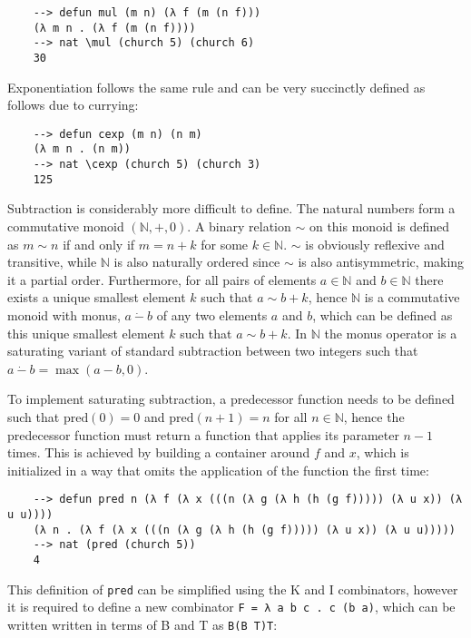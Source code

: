\begin{Verbatim}
    --> defun mul (m n) (λ f (m (n f)))
    (λ m n . (λ f (m (n f))))
    --> nat \mul (church 5) (church 6)
    30
\end{Verbatim}

Exponentiation follows the same rule and can be very succinctly defined as follows due to currying:

\begin{Verbatim}
    --> defun cexp (m n) (n m)
    (λ m n . (n m))
    --> nat \cexp (church 5) (church 3)
    125
\end{Verbatim}

Subtraction is considerably more difficult to define. The natural numbers form a commutative monoid $(\mathbb{N}, +, 0)$. A binary relation $\sim$ on this monoid is defined as $m\sim n$ if and only if $m = n + k$ for some $k \in \mathbb{N}$. $\sim$ is obviously reflexive and transitive, while $\mathbb{N}$ is also naturally ordered since $\sim$ is also antisymmetric, making it a partial order. Furthermore, for all pairs of elements $a \in \mathbb{N}$ and $b \in \mathbb{N}$ there exists a unique smallest element $k$ such that $a \sim b + k$, hence $\mathbb{N}$ is a commutative monoid with monus, $a\ \dot -\ b$ of any two elements $a$ and $b$, which can be defined as this unique smallest element $k$ such that $a \sim b + k$. In $\mathbb{N}$ the monus operator is a saturating variant of standard subtraction between two integers such that $a\ \dot -\ b = \max(a - b, 0)$. 

To implement saturating subtraction, a predecessor function needs to be defined such that $\text{pred}(0) = 0$ and $\text{pred}(n + 1) = n$ for all $n \in \mathbb{N}$, hence the predecessor function must return a function that applies its parameter $n - 1$ times. This is achieved by building a container around $f$ and $x$, which is initialized in a way that omits the application of the function the first time:

\begin{Verbatim}
    --> defun pred n (λ f (λ x (((n (λ g (λ h (h (g f))))) (λ u x)) (λ u u))))
    (λ n . (λ f (λ x (((n (λ g (λ h (h (g f))))) (λ u x)) (λ u u)))))
    --> nat (pred (church 5))
    4
\end{Verbatim}

This definition of \verb|pred| can be simplified using the K and I combinators, however it is required to define a new combinator \verb|F = λ a b c . c (b a)|, which can be written written in terms of B and T as \verb|B(B T)T|:

